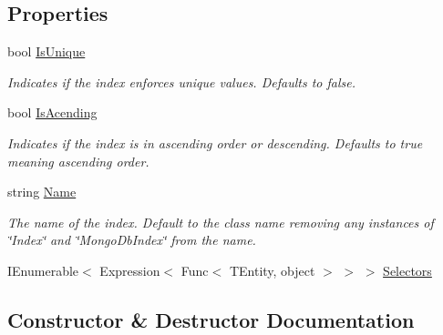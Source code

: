 \subsection*{Properties}
\begin{DoxyCompactItemize}
\item 
bool \hyperlink{classCqrs_1_1MongoDB_1_1DataStores_1_1Indexes_1_1MongoDbIndex_a8618b5c9ec2aa1972a57b61aac05bcdd}{Is\+Unique}
\begin{DoxyCompactList}\small\item\em Indicates if the index enforces unique values. Defaults to false. \end{DoxyCompactList}\item 
bool \hyperlink{classCqrs_1_1MongoDB_1_1DataStores_1_1Indexes_1_1MongoDbIndex_a0151a455f20dabb16c15156dc1cdf85f}{Is\+Acending}
\begin{DoxyCompactList}\small\item\em Indicates if the index is in ascending order or descending. Defaults to true meaning ascending order. \end{DoxyCompactList}\item 
string \hyperlink{classCqrs_1_1MongoDB_1_1DataStores_1_1Indexes_1_1MongoDbIndex_af18f67df8e73bc4d9fc2239cd6d798b6}{Name}
\begin{DoxyCompactList}\small\item\em The name of the index. Default to the class name removing any instances of \char`\"{}\+Index\char`\"{} and \char`\"{}\+Mongo\+Db\+Index\char`\"{} from the name. \end{DoxyCompactList}\item 
I\+Enumerable$<$ Expression$<$ Func$<$ T\+Entity, object $>$ $>$ $>$ \hyperlink{classCqrs_1_1MongoDB_1_1DataStores_1_1Indexes_1_1MongoDbIndex_a13bb1a8d07f1cce7c8d6ce77e3be0629}{Selectors}
\end{DoxyCompactItemize}


\subsection{Constructor \& Destructor Documentation}
\mbox{\label{classCqrs_1_1MongoDB_1_1DataStores_1_1Indexes_1_1MongoDbIndex_a61f4b17dd968f92e81562c70ae062a89}} 
